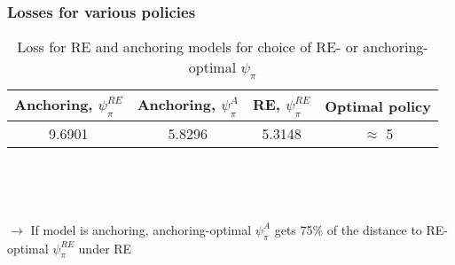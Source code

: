 \documentclass[10pt]{beamer}
\def \myFigPath {../../../figures/}
\def\fignameIRFpsipiSmall{RIR_unanch_psi_pi1_01_command_IRFs_approx_pretty_2020_09_12}
\def\fignameIRFpsipiMedium{RIR_unanch_psi_pi1_5_command_IRFs_approx_pretty_2020_09_07}
\def\fignameIRFpsipiBig{RIR_unanch_psi_pi2_command_IRFs_approx_pretty_2020_09_12}
\begin{document}
%
%
%

\begin{frame}
	\frametitle{Losses for various policies}
	
\begin{center}
\begin{table}[h!]
      \caption{Loss for RE and anchoring models for choice of RE- or anchoring-optimal $\psi_{\pi}$}  

\begin{tabular}{ c | c | c | c}
Anchoring, $\psi_{\pi}^{RE}$ & Anchoring, $\psi_{\pi}^{A}$ & RE, $\psi_{\pi}^{RE}$ & Optimal policy \\  \hline
 9.6901  &  5.8296 & 5.3148 & $\approx$ 5 \\  \hline
\end{tabular}     
      \label{table_welfare}
 \end{table}
\end{center}

\

\

$\rightarrow$ If model is anchoring, anchoring-optimal $\psi_{\pi}^A$ gets 75\% of the distance to RE-optimal $\psi_{\pi}^{RE}$ under RE


\end{frame}
\end{document}
